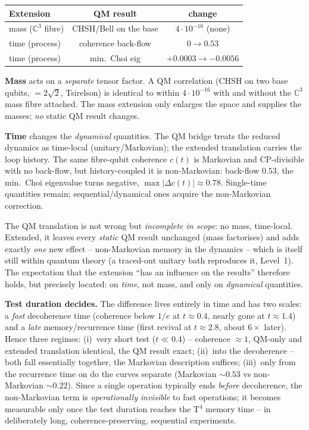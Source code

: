 \begin{center}
\begin{tabular}{lcc}
\toprule
Extension & QM result & change \\
\midrule
mass ($\mathbb{C}^3$ fibre) & CHSH/Bell on the base & $4\cdot10^{-16}$ (none) \\
time (process) & coherence back-flow & $0 \to 0.53$ \\
time (process) & min.\ Choi eig & $+0.0003 \to -0.0056$ \\
\bottomrule
\end{tabular}
\end{center}

\textbf{Mass} acts on a \emph{separate} tensor factor. A QM correlation (CHSH on
two base qubits, $=2\sqrt2$, Tsirelson) is identical to within $4\cdot10^{-16}$
with and without the $\mathbb{C}^3$ mass fibre attached. The mass extension only
enlarges the space and supplies the masses; \emph{no} static QM result changes.

\textbf{Time} changes the \emph{dynamical} quantities. The QM bridge treats the
reduced dynamics as time-local (unitary/Markovian); the extended translation
carries the loop history. The same fibre-qubit coherence $c(t)$ is Markovian and
CP-divisible with no back-flow, but history-coupled it is non-Markovian:
back-flow $0.53$, the min.\ Choi eigenvalue turns negative,
$\max|\Delta c(t)|\approx0.78$. Single-time quantities remain; sequential/dynamical
ones acquire the non-Markovian correction.

\begin{keyresult}
The QM translation is not wrong but \emph{incomplete in scope}: no mass,
time-local. Extended, it leaves every \emph{static} QM result unchanged (mass
factorises) and adds exactly \emph{one} new effect -- non-Markovian memory in the
dynamics -- which is itself still within quantum theory (a traced-out unitary bath
reproduces it, Level~1). The expectation that the extension \enquote{has an
influence on the results} therefore holds, but precisely located: on \emph{time},
not mass, and only on \emph{dynamical} quantities.
\end{keyresult}

\smallskip
\noindent\textbf{Test duration decides.} The difference lives entirely in time and
has two scales: a \emph{fast} decoherence time (coherence below $1/e$ at
$t\approx0.4$, nearly gone at $t\approx1.4$) and a \emph{late} memory/recurrence
time (first revival at $t\approx2.8$, about $6\times$ later). Hence three regimes:
(i)~very short test ($t\ll0.4$) -- coherence $\approx1$, QM-only and extended
translation identical, the QM result exact; (ii)~into the decoherence -- both fall
essentially together, the Markovian description suffices; (iii)~only from the
recurrence time on do the curves separate (Markovian $\sim0.53$ vs non-Markovian
$\sim0.22$). Since a single operation typically ends \emph{before} decoherence,
the non-Markovian term is \emph{operationally invisible} to fast operations; it
becomes measurable only once the test duration reaches the T$^4$ memory time -- in
deliberately long, coherence-preserving, sequential experiments.

